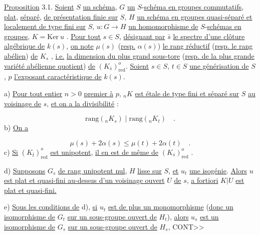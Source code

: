 \underline{Proposition} 3.1. \underline{Soient} $S$ \underline{un schéma}, $G$ \underline{un} $S$-\underline{schéma en groupes commutatifs}, \underline{plat}, \underline{séparé}, \underline{de présentation finie sur} $S$, $H$ \underline{un schéma en groupes quasi-séparé et localement de type fini sur} $S$, $u: G \longrightarrow H$ \underline{un homomorphisme de} $S$-\underline{schémas en groupes}, $K = \mathrm{Ker}\ u$ . \underline{Pour tout} $s \in S$, \underline{désignant par} $\bar{s}$ \underline{le spectre d'une clôture algébrique de} $k(s)$, \underline{on note} $\mu(s)$ (\underline{resp.} $\alpha(s)$) \underline{le rang réductif} (\underline{resp. le rang abélien}) \underline{de} $K_{s}$ , \underline{i.e.} \underline{la dimension du plus grand sous-tore} (\underline{resp. de la plus grande variété abélienne quotient}) \underline{de} $(K_{\bar{s}})^{o}_{\mathrm{red}}$. \underline{Soient} $s \in S$, $t \in S$ \underline{une générisation de} $S$, $p$ \underline{l'exposant caractéristique de} $k(s)$.

a) \underline{Pour tout entier} $n > 0$ \underline{premier à} $p$, ${}_{n}K$ \underline{est étale de type fini et séparé sur} $S$ \underline{au voisinage de} $s$, \underline{et on a la divisibilité} :

\begin{equation}\tag{3.1.1}
\mathrm{rang}({}_{n}K_{s}) \mid \mathrm{rang}({}_{n}K_{t}) \quad .
\end{equation}
b) \underline{On a}

\begin{equation}\tag{3.1.2}
\mu(s) + 2\alpha(s) \leq \mu(t) + 2\alpha(t) \quad .
\end{equation}
c) \underline{Si} $(K_{\bar{t}})^{o}_{\mathrm{red}}$ \underline{est unipotent}, \underline{il en est de même de} $(K_{\bar{s}})^{o}_{\mathrm{red}}$ .

d) \underline{Supposons} $G_{s}$ \underline{de rang unipotent nul}, $H$ \underline{lisse sur} $S$, \underline{et} $u_{t}$ \underline{une isogénie}. \underline{Alors} $u$ \underline{est plat et quasi-fini au-dessus d'un voisinage ouvert} $U$ \underline{de} $s$, \underline{a fortiori} $K|U$ \underline{est plat et quasi-fini.}

e) \underline{Sous les conditions de} d), \underline{si} $u_{t}$ \underline{est de plus un monomorphisme} (\underline{donc un isomorphisme de} $G_{t}$ \underline{sur un sous-groupe ouvert de} $H_{t}$), \underline{alors} $u_{s}$ \underline{est un isomorphisme de} $G_{s}$ \underline{sur un sous-groupe ouvert de} $H_{s}$, CONT>>


